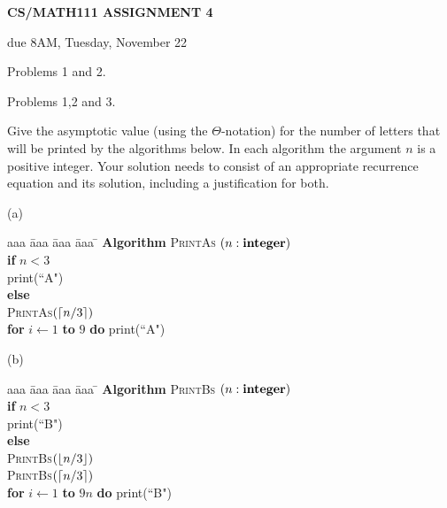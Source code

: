 \documentclass{article}
\newcommand{\hwduedate}{{8AM, Tuesday, November 22}}
\begin{document}

\centerline{\large \bf CS/MATH111 ASSIGNMENT 4}
\centerline{due {\hwduedate}}

\vskip 0.2in
 Problems 1 and 2.

 Problems 1,2 and 3.

\vskip 0.15in



\begin{problem}
Give the asymptotic value (using the $\Theta$-notation)
for the number of letters that will be printed by the algorithms below.
In each algorithm the argument $n$ is a positive integer.
Your solution needs to consist of an appropriate recurrence 
equation and its solution, including a justification for both. 

\bigskip
\noindent
(a)\ \ 
\begin{minipage}[t]{3in}
\begin{tabbing}
aaa \= aaa \= aaa \= aaa \=  \kill
\textbf{Algorithm} \textsc{PrintAs} $(n: \mbox{\bf integer})$ \\
          \> \textbf{if} $n < 3$ \\
          \>\>  print(``A") \\
          \>\textbf{else} \\
          	\>\> \textsc{PrintAs}$({\left\lceil n/3\right\rceil})$\\
      		\>\> \textbf{for} $i \leftarrow 1$ \textbf{to} $9$ \textbf{do} print(``A")
\end{tabbing}
\end{minipage}

\bigskip
\noindent
(b)\ \
\begin{minipage}[t]{3in}
\begin{tabbing}
aaa \= aaa \= aaa \= aaa \=  \kill
\textbf{Algorithm} \textsc{PrintBs} $(n: \mbox{\bf integer})$ \\
          \> \textbf{if} $n < 3$ \\
          \>\>  print(``B") \\
          \>\textbf{else} \\
          \>\>  \textsc{PrintBs}$({\left\lfloor n/3\right\rfloor})$\\
         \>\>  \textsc{PrintBs}$({\left\lceil n/3\right\rceil})$\\
      \>\> \textbf{for} $i \leftarrow 1$ \textbf{to} $9n$ \textbf{do} print(``B")
\end{tabbing}
\end{minipage}


\end{problem}
\end{document}
